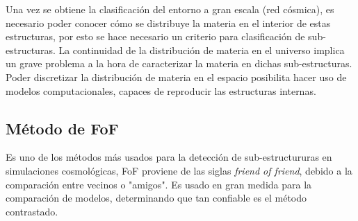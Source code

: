 Una vez se obtiene la clasificación del entorno a gran escala (red cósmica), es necesario poder conocer cómo se distribuye la materia en el interior de estas estructuras, por esto se hace necesario un criterio para clasificación de sub-estructuras. La continuidad de la distribución de materia en el universo implica un grave problema a la hora de caracterizar la materia en dichas sub-estructuras. Poder discretizar la distribución de materia en el espacio posibilita hacer uso de modelos computacionales, capaces de reproducir las estructuras internas.

    \subsection{Método de FoF}
    \label{subsec: FoF}

Es uno de los métodos más usados para la detección de sub-estructururas en simulaciones cosmológicas, FoF proviene de las siglas {\it{friend of friend}}, debido a la comparación entre vecinos o "amigos". Es usado en gran medida para la comparación de modelos,  determinando que tan confiable es el método contrastado. 

